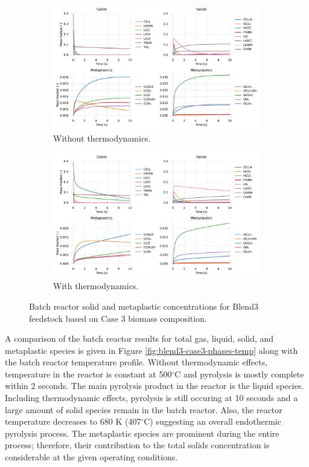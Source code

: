 \begin{figure}[H]
    \begin{subfigure}{\textwidth}
        \centering
        \includegraphics[width=\textwidth]{figures/blend3-case3-solids-meta.pdf}
        \caption{Without thermodynamics.}
    \end{subfigure}
    \begin{subfigure}{\textwidth}
        \centering
        \includegraphics[width=\textwidth]{figures/blend3-case3-solids-meta-thermo.pdf}
        \caption{With thermodynamics.}
    \end{subfigure}
    \caption{Batch reactor solid and metaplastic concentrations for Blend3 feedstock based on Case 3 biomass composition.}
    \label{fig:blend3-case3-solids-meta}
\end{figure}

A comparison of the batch reactor results for total gas, liquid, solid, and metaplastic species is given in Figure \ref{fig:blend3-case3-phases-temp} along with the batch reactor temperature profile. Without thermodynamic effects, temperature in the reactor is constant at 500$^{\circ}$C and pyrolysis is mostly complete within 2 seconds. The main pyrolysis product in the reactor is the liquid species. Including thermodynamic effects, pyrolysis is still occuring at 10 seconds and a large amount of solid species remain in the batch reactor. Also, the reactor temperature decreases to 680 K (407$^{\circ}$C) suggesting an overall endothermic pyrolysis process. The metaplastic species are prominent during the entire process; therefore, their contribution to the total solids concentration is considerable at the given operating conditions.

